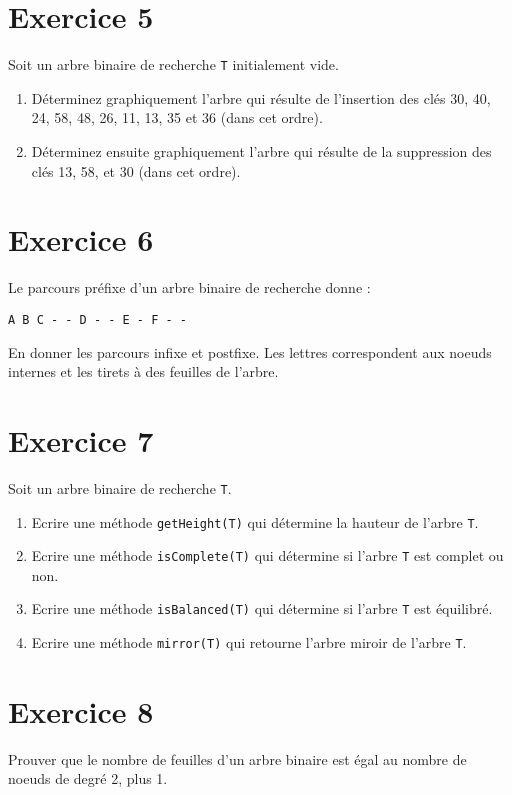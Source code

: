 \documentclass[a4paper,10pt]{article}
\begin{document}
\section*{Exercice 5}

Soit un arbre binaire de recherche \texttt{T} initialement vide.

\begin{enumerate}

\item Déterminez graphiquement l'arbre qui résulte de l'insertion des clés 30, 40, 24, 58, 48, 26, 11, 13, 35 et 36 (dans cet ordre).

\item Déterminez ensuite graphiquement l'arbre qui résulte de la suppression des clés 13, 58, et 30 (dans cet ordre).

\end{enumerate}

\section*{Exercice 6}

Le parcours préfixe d'un arbre binaire de recherche donne :
\begin{verbatim}
A B C - - D - - E - F - -
\end{verbatim}

En donner les parcours infixe et postfixe. Les lettres correspondent aux
noeuds internes et les tirets à des feuilles de l'arbre.

\section*{Exercice 7}

Soit un arbre binaire de recherche \texttt{T}.

\begin{enumerate}

\item Ecrire une méthode \texttt{getHeight(T)} qui détermine la hauteur de l'arbre \texttt{T}.

\item Ecrire une méthode \texttt{isComplete(T)} qui détermine si l'arbre \texttt{T} est complet ou non.

\item Ecrire une méthode \texttt{isBalanced(T)} qui détermine si l'arbre \texttt{T} est équilibré.

\item Ecrire une méthode \texttt{mirror(T)} qui retourne l'arbre miroir de l'arbre \texttt{T}.

\end{enumerate}

\section*{Exercice 8}

Prouver que le nombre de feuilles d'un arbre binaire est égal au nombre de noeuds de degré 2, plus 1.
\end{document}
